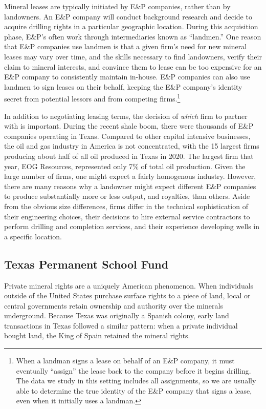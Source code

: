 \documentclass[12pt]{article}
\begin{document}
Mineral leases are typically initiated by E\&P companies, rather than by landowners. An E\&P company will conduct background research and decide to acquire drilling rights in a particular geographic location. During this acquisition phase, E\&P's often work through intermediaries known as ``landmen.'' One reason that E\&P companies use landmen is that a given firm's need for new mineral leases may vary over time, and the skills necessary to find landowners, verify their claim to mineral interests, and convince them to lease can be too expensive for an E\&P company to consistently maintain in-house. E\&P companies can also use landmen to sign leases on their behalf, keeping the E\&P company's identity secret from potential lessors and from competing firms.\footnote{When a landman signs a lease on behalf of an E\&P company, it must eventually ``assign'' the lease back to the company before it begins drilling.  The data we study in this setting includes all assignments, so we are usually able to determine the true identity of the E\&P company that signs a lease, even when it initially uses a landman.} 

In addition to negotiating leasing terms, the decision of \emph{which} firm to partner with is important.  During the recent shale boom, there were thousands of E\&P companies operating in Texas.  Compared to other capital intensive businesses, the oil and gas industry in America is not concentrated, with the 15 largest firms producing about half of all oil produced in Texas in 2020.  The largest firm that year, EOG Resources, represented only 7\% of total oil production.  Given the large number of firms, one might expect a fairly homogenous industry.  However, there are many reasons why a landowner might expect different E\&P companies to produce substantially more or less output, and royalties, than others.  Aside from the obvious size differences, firms differ in the technical sophistication of their engineering choices, their decisions to hire external service contractors to perform drilling and completion services, and their experience developing wells in a specific location. 

\subsection{Texas Permanent School Fund \label{sec:PSF}}

Private mineral rights are a uniquely American phenomenon. When individuals outside of the United States purchase surface rights to a piece of land, local or central governments retain ownership and authority over the minerals underground. Because Texas was originally a Spanish colony, early land transactions in Texas followed a similar pattern: when a private individual bought land, the King of Spain retained the mineral rights. 
\end{document}
